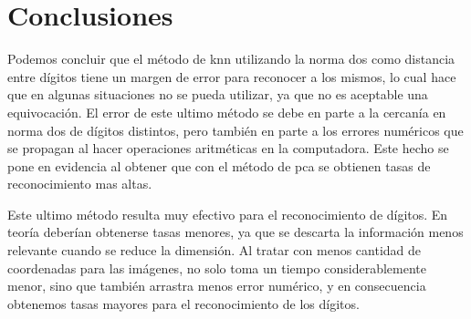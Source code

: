 \section{Conclusiones}

Podemos concluir que el método de knn utilizando la norma dos como distancia entre dígitos tiene un margen de error para reconocer a los mismos, lo cual hace que en algunas situaciones no se pueda utilizar, ya que no es aceptable una equivocación. El error de este ultimo método se debe en parte a la cercanía en norma dos de dígitos distintos, pero también en parte a los errores numéricos que se propagan al hacer operaciones aritméticas en la computadora. Este hecho se pone en evidencia al obtener que con el método de pca se obtienen tasas de reconocimiento mas altas. 

Este ultimo método resulta muy efectivo para el reconocimiento de dígitos. En teoría deberían obtenerse tasas menores, ya que se descarta la información menos relevante cuando se reduce la dimensión. Al tratar con menos cantidad de coordenadas para las imágenes, no solo toma un tiempo considerablemente menor, sino que también arrastra menos error numérico, y en consecuencia obtenemos tasas mayores para el reconocimiento de los dígitos.

 
